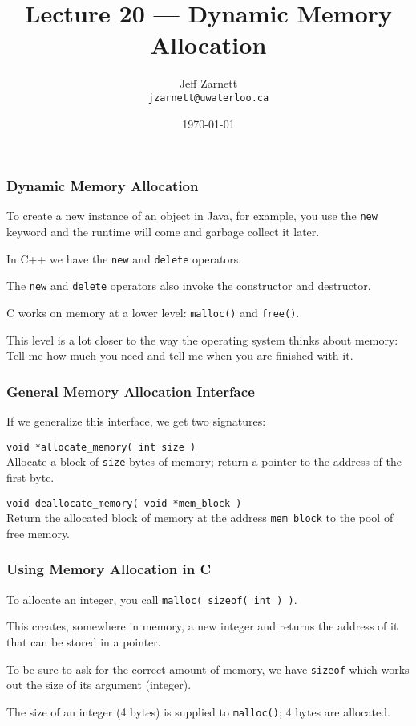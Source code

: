 

\title{Lecture 20 --- Dynamic Memory Allocation}

\author{Jeff Zarnett \\ \small \texttt{jzarnett@uwaterloo.ca}}
\date{\today}




\begin{frame}
  \titlepage

 \end{frame}
 
 

\begin{frame}
\frametitle{Dynamic Memory Allocation}

To create a new instance of an object in Java, for example, you use the \texttt{new} keyword and the runtime will come and garbage collect it later.

In C++ we have the \texttt{new} and \texttt{delete} operators. 

The \texttt{new} and \texttt{delete} operators also invoke the constructor and destructor. 

C works on memory at a lower level: \texttt{malloc()} and \texttt{free()}. 

This level is a lot closer to the way the operating system thinks about memory: \\
\quad Tell me how much you need and tell me when you are finished with it.


\end{frame}

\begin{frame}
\frametitle{General Memory Allocation Interface}

If we generalize this interface, we get two signatures:

\texttt{void *allocate\_memory( int size )}\\
Allocate a block of \texttt{size} bytes of memory; return a pointer to the address of the first byte.

\texttt{void deallocate\_memory( void *mem\_block )}\\
Return the allocated block of memory at the address \texttt{mem\_block} to the pool of free memory.


\end{frame}

\begin{frame}
\frametitle{Using Memory Allocation in C}

To allocate an integer, you call \texttt{malloc( sizeof( int ) )}. 

This creates, somewhere in memory, a new integer and returns the address of it that can be stored in a pointer.

To be sure to ask for the correct amount of memory, we have \texttt{sizeof} which works out the size of its argument (integer).

The size of an integer (4 bytes) is supplied to \texttt{malloc()}; 4 bytes are allocated. 

\end{frame}

